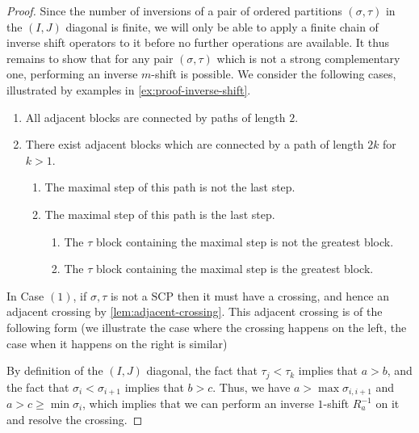 \documentclass{amsart}
\theoremstyle{definition}
\newcommand{\SCP}{\mathrm{SCP}}
\begin{document}
\begin{proof}
    Since the number of inversions of a pair of ordered partitions $(\sigma,\tau)$ in the $(I,J)$ diagonal is finite, we will only be able to apply a finite chain of inverse shift operators to it before no further operations are available. 
It thus remains to show that for any pair $(\sigma,\tau)$ which is not a strong complementary one, performing an inverse $m$-shift is possible. 
We consider the following cases, illustrated by examples in \cref{ex:proof-inverse-shift}.
\begin{enumerate}
    \item All adjacent blocks are connected by paths of length $2$.
    \item There exist adjacent blocks which are connected by a path of length $2k$ for $k>1$.
    \begin{enumerate}
        \item The maximal step of this path is not the last step.
        \item The maximal step of this path is the last step.
        \begin{enumerate}
            \item The $\tau$ block containing the maximal step is not the greatest block.
            \item The $\tau$ block containing the maximal step is the greatest block.
        \end{enumerate}
    \end{enumerate}
\end{enumerate}
In Case $(1)$, if $\sigma,\tau$ is not a $\SCP$ then it must have a crossing, and hence an adjacent crossing by \cref{lem:adjacent-crossing}. 
This adjacent crossing is of the following form (we illustrate the case where the crossing happens on the left, the case when it happens on the right is similar) 
\begin{center}
\end{center}
By definition of the $(I,J)$ diagonal, the fact that $\tau_j < \tau_k$ implies that $a > b$, and the fact that $\sigma_i < \sigma_{i+1}$ implies that $b>c$.
Thus, we have $a > \max \sigma_{i,i+1}$ and $a > c \geq \min \sigma_i$, which implies that we can perform an inverse $1$-shift $R_a^{-1}$ on it and resolve the crossing. 


\end{proof}
\end{document}
